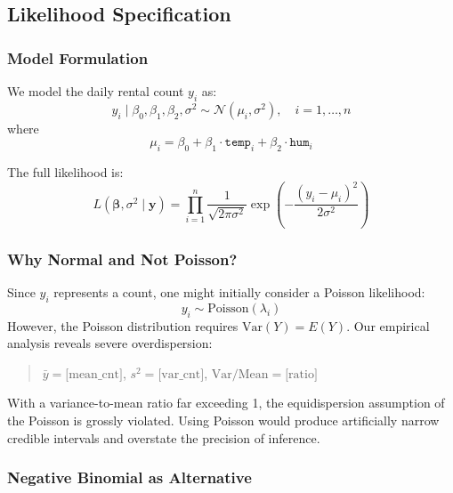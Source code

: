 \subsection{Likelihood Specification}\label{sec:likelihood}

\subsubsection{Model Formulation}

We model the daily rental count $y_i$ as:
\begin{equation}
    y_i \mid \beta_0, \beta_1, \beta_2, \sigma^2 \sim \mathcal{N}(\mu_i, \sigma^2), \quad i = 1, \ldots, n
\end{equation}
where
\begin{equation}
    \mu_i = \beta_0 + \beta_1 \cdot \texttt{temp}_i + \beta_2 \cdot \texttt{hum}_i
\end{equation}

The full likelihood is:
\begin{equation}
    L(\boldsymbol{\beta}, \sigma^2 \mid \mathbf{y}) = \prod_{i=1}^{n} \frac{1}{\sqrt{2\pi\sigma^2}} \exp\left( -\frac{(y_i - \mu_i)^2}{2\sigma^2} \right)
\end{equation}

\subsubsection{Why Normal and Not Poisson?}

Since $y_i$ represents a count, one might initially consider a Poisson likelihood:
\begin{equation}
    y_i \sim \text{Poisson}(\lambda_i)
\end{equation}
However, the Poisson distribution requires $\text{Var}(Y) = E(Y)$. Our empirical analysis reveals severe overdispersion:

\begin{quote}
    $\bar{y} = \text{[mean\_cnt]}$, \quad $s^2 = \text{[var\_cnt]}$, \quad $\text{Var}/\text{Mean} = \text{[ratio]}$
\end{quote}

With a variance-to-mean ratio far exceeding 1, the equidispersion assumption of the Poisson is grossly violated. Using Poisson would produce artificially narrow credible intervals and overstate the precision of inference.

\subsubsection{Negative Binomial as Alternative}

